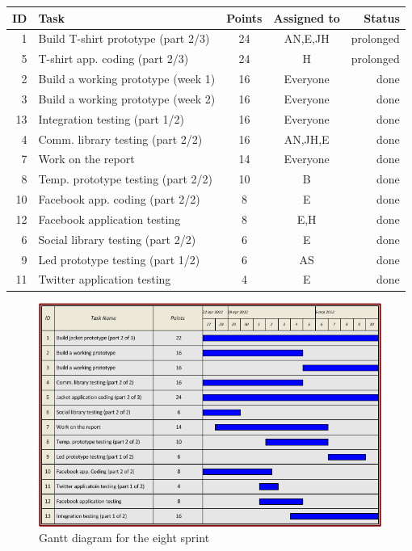 \begin{table}[ht!]
\begin{tabular}{ | r | l | c | c | r | }

\hline
\textbf{ID} & \textbf{Task} & \textbf{Points} & \textbf{Assigned to} & \textbf{Status} \\
\hline

 1 & Build T-shirt prototype (part 2/3)			& 24 & AN,E,JH		& prolonged \\
\hline
 5 & T-shirt app. coding (part 2/3)				& 24 & H			& prolonged \\
\hline
 2 & Build a working prototype (week 1)			& 16 & Everyone		& done \\
\hline
 3 & Build a working prototype (week 2)			& 16 & Everyone		& done \\
\hline
 13 & Integration testing (part 1/2)			& 16 & Everyone		& done \\
\hline
 4 & Comm. library testing (part 2/2)			& 16 & AN,JH,E		& done \\
\hline
 7 & Work on the report							& 14 & Everyone		& done \\
\hline
 8 & Temp. prototype testing (part 2/2)			& 10 & B			& done \\
\hline
 10 & Facebook app. coding (part 2/2)			& 8  & E			& done \\
\hline
 12 & Facebook application testing				& 8  & E,H			& done \\
\hline
 6 & Social library testing (part 2/2)			& 6  & E			& done \\
\hline
 9 & Led prototype testing (part 1/2)			& 6  & AS			& done \\
\hline
 11 & Twitter application testing				& 4	 & E			& done \\
\hline

\end{tabular}
\end{table}

\begin{figure}[h!]
\centering \includegraphics[scale=0.8]{img/sprints-gantt8.png}
\caption{Gantt diagram for the eight sprint}
\label{fig:sprints-gantt8}
\end{figure}

